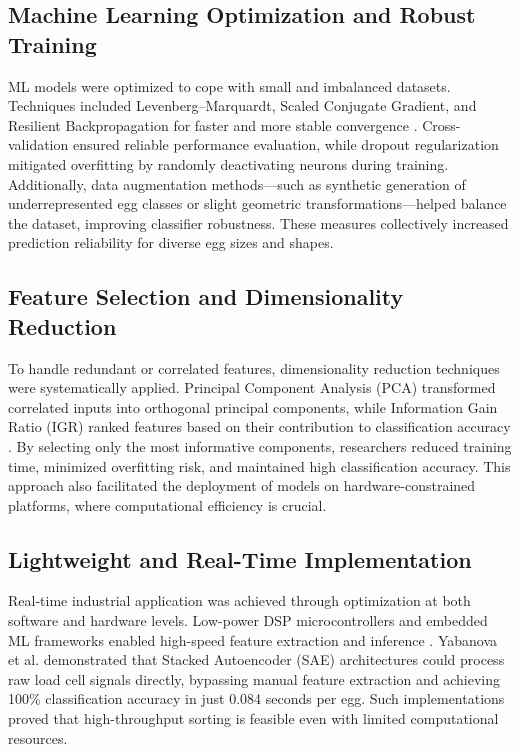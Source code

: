 \documentclass[conference]{IEEEtran}
\begin{document}
	\subsection{Machine Learning Optimization and Robust Training}
	
	ML models were optimized to cope with small and imbalanced datasets. Techniques included Levenberg–Marquardt, Scaled Conjugate Gradient, and Resilient Backpropagation for faster and more stable convergence \cite{asadi2010}\cite{soltani2015}. Cross-validation ensured reliable performance evaluation, while dropout regularization mitigated overfitting by randomly deactivating neurons during training. Additionally, data augmentation methods—such as synthetic generation of underrepresented egg classes or slight geometric transformations—helped balance the dataset, improving classifier robustness. These measures collectively increased prediction reliability for diverse egg sizes and shapes.
	
	\subsection{Feature Selection and Dimensionality Reduction}
	
	To handle redundant or correlated features, dimensionality reduction techniques were systematically applied. Principal Component Analysis (PCA) transformed correlated inputs into orthogonal principal components, while Information Gain Ratio (IGR) ranked features based on their contribution to classification accuracy \cite{nasir2018}. By selecting only the most informative components, researchers reduced training time, minimized overfitting risk, and maintained high classification accuracy. This approach also facilitated the deployment of models on hardware-constrained platforms, where computational efficiency is crucial.
	
	\subsection{Lightweight and Real-Time Implementation}
	
	Real-time industrial application was achieved through optimization at both software and hardware levels. Low-power DSP microcontrollers and embedded ML frameworks enabled high-speed feature extraction and inference \cite{secil2020}. Yabanova et al. \cite{yabanova2025} demonstrated that Stacked Autoencoder (SAE) architectures could process raw load cell signals directly, bypassing manual feature extraction and achieving 100\% classification accuracy in just 0.084 seconds per egg. Such implementations proved that high-throughput sorting is feasible even with limited computational resources.
	
\end{document}
